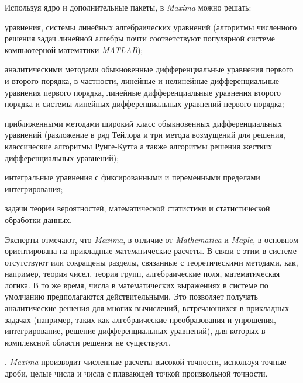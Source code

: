 Используя ядро и дополнительные пакеты, в \textit{Maxima} можно решать:
\begin{textitemize}
	\item уравнения, системы линейных алгебраических уравнений (алгоритмы численного решения задач линейной алгебры почти соответствуют популярной системе компьютерной математики \textit{MATLAB});
	\item аналитическими методами обыкновенные дифференциальные уравнения первого и второго порядка, в частности, линейные и нелинейные дифференциальные уравнения первого порядка, линейные дифференциальные уравнения второго порядка и системы линейных дифференциальных уравнений первого порядка;
	\item приближенными методами широкий класс обыкновенных дифференциальных уравнений (разложение в ряд Тейлора и три метода возмущений для решения, классические алгоритмы Рунге-Кутта а также алгоритмы решения жестких дифференциальных уравнений);
	\item интегральные уравнения с фиксированными и переменными пределами интегрирования;
	\item задачи теории вероятностей, математической статистики и статистической обработки данных.
\end{textitemize}

Эксперты отмечают, что \textit{Maxima}, в отличие от \textit{Mathematica} и \textit{Maple}, в основном ориентирована на прикладные математические расчеты. В связи с этим в системе отсутствуют или сокращены разделы, связанные с теоретическими методами, как, например, теория чисел, теория групп, алгебраические поля, математическая логика. В то же время, числа в математических выражениях в системе по умолчанию предполагаются действительными. Это позволяет получать аналитические решения для многих вычислений, встречающихся в прикладных задачах (например, таких как алгебраические преобразования и упрощения, интегрирование, решение дифференциальных уравнений), для которых в комплексной области решения не существуют.

. \textit{Maxima} производит численные расчеты высокой точности, используя точные дроби, целые числа и числа с плавающей точкой произвольной точности.

